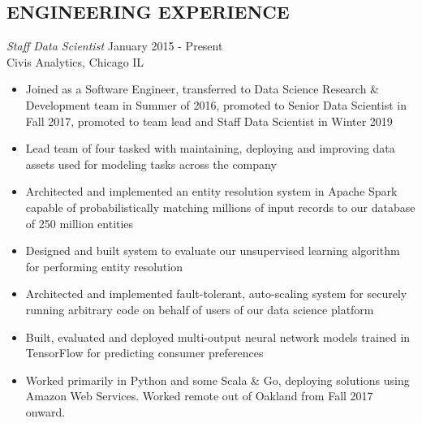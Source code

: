 \documentclass[line,margin]{res}
\begin{document}
\address{waltaskew@gmail.com}
\address{404-819-9796}

\begin{resume}

\section{ENGINEERING EXPERIENCE}
        {\sl Staff Data Scientist} \hfill January 2015 - Present \\
        Civis Analytics, Chicago IL
        \begin{itemize}
          \item Joined as a Software Engineer, transferred to Data
            Science Research \& Development team in Summer of 2016,
            promoted to Senior Data Scientist in Fall 2017, promoted
            to team lead and Staff Data Scientist in Winter 2019
          \item Lead team of four tasked with maintaining, deploying
            and improving data assets used for modeling tasks across
            the company
          \item Architected and implemented an entity resolution
            system in Apache Spark capable of probabilistically
            matching millions of input records to our database of 250
            million entities
          \item Designed and built system to evaluate our unsupervised
            learning algorithm for performing entity resolution
          \item Architected and implemented fault-tolerant,
            auto-scaling system for securely running arbitrary code on
            behalf of users of our data science platform
          \item Built, evaluated and deployed multi-output neural
            network models trained in TensorFlow for predicting
            consumer preferences
          \item Worked primarily in Python and some Scala \& Go, deploying
            solutions using Amazon Web Services. Worked remote out of
            Oakland from Fall 2017 onward.
        \end{itemize}


\end{resume}
\end{document}
